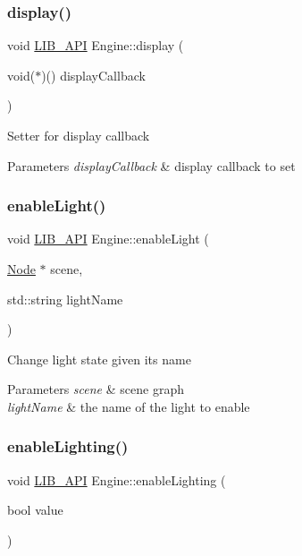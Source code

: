 \subsubsection{\texorpdfstring{display()}{display()}}
{\footnotesize\ttfamily void \hyperlink{Engine_8h_a77278c8cc96e39fb27b5d0a347c8fb3d}{L\+I\+B\+\_\+\+A\+PI} Engine\+::display (\begin{DoxyParamCaption}\item[{void($\ast$)()}]{display\+Callback }\end{DoxyParamCaption})}

Setter for display callback 
\begin{DoxyParams}{Parameters}
{\em display\+Callback} & display callback to set \\
\hline
\end{DoxyParams}
\mbox{\label{classEngine_a177922eb00045463beb7b5f0e2a59da4}} 
\subsubsection{\texorpdfstring{enable\+Light()}{enableLight()}}
{\footnotesize\ttfamily void \hyperlink{Engine_8h_a77278c8cc96e39fb27b5d0a347c8fb3d}{L\+I\+B\+\_\+\+A\+PI} Engine\+::enable\+Light (\begin{DoxyParamCaption}\item[{\hyperlink{classNode}{Node} $\ast$}]{scene,  }\item[{std\+::string}]{light\+Name }\end{DoxyParamCaption})}

Change light state given its name 
\begin{DoxyParams}{Parameters}
{\em scene} & scene graph \\
\hline
{\em light\+Name} & the name of the light to enable \\
\hline
\end{DoxyParams}
\mbox{\label{classEngine_a3f48d4bd248688249c8b1ad74d33117e}} 
\subsubsection{\texorpdfstring{enable\+Lighting()}{enableLighting()}}
{\footnotesize\ttfamily void \hyperlink{Engine_8h_a77278c8cc96e39fb27b5d0a347c8fb3d}{L\+I\+B\+\_\+\+A\+PI} Engine\+::enable\+Lighting (\begin{DoxyParamCaption}\item[{bool}]{value }\end{DoxyParamCaption})}

